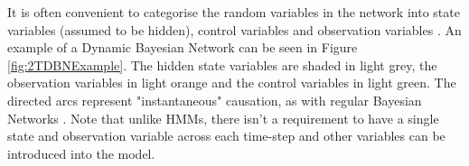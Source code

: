 It is often convenient to categorise the random variables in the network into state variables (assumed to be hidden), control variables and observation variables \cite{Thrun:2005:ProbabilisticRobotics}. An example of a Dynamic Bayesian Network can be seen in Figure \ref{fig:2TDBNExample}. The hidden state variables are shaded in light grey, the observation variables in light orange and the control variables in light green. The directed arcs represent "instantaneous" causation, as with regular Bayesian Networks \cite[p.~15]{Murphy1994DynamicLearning}. Note that unlike HMMs, there isn't a requirement to have a single state and observation variable across each time-step and other variables can be introduced into the model.













